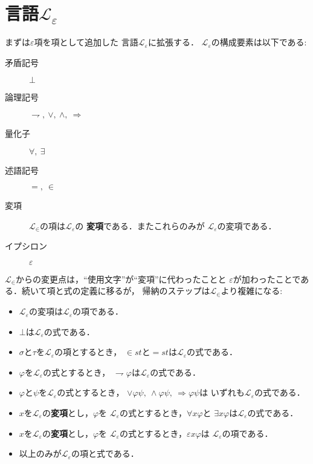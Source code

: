 \section{言語$\mathcal{L}_{\varepsilon}$}
	まずは$\varepsilon$項を項として追加した
	言語$\mathcal{L}_{\varepsilon}$に拡張する．
	$\mathcal{L}_{\varepsilon}$の構成要素は以下である:
	
	\begin{description}
		\item[矛盾記号] $\bot$
		\item[論理記号] $\rightharpoondown,\ \vee,\ \wedge,\ \Longrightarrow$
		\item[量化子] $\forall,\ \exists$
		\item[述語記号] $=,\ \in$
		\item[変項] $\mathcal{L}_{\in}$の項は$\mathcal{L}_{\varepsilon}$の
			{\bf 変項}である．またこれらのみが
			$\mathcal{L}_{\varepsilon}$の変項である．
		\item[イプシロン] $\varepsilon$
	\end{description}
	
	$\mathcal{L}_{\in}$からの変更点は，``使用文字''が``変項''に代わったことと
	$\varepsilon$が加わったことである．続いて項と式の定義に移るが，
	帰納のステップは$\mathcal{L}_{\in}$より複雑になる:
	
	\begin{itemize}
		\item $\mathcal{L}_{\varepsilon}$の変項は$\mathcal{L}_{\varepsilon}$の項である．
		\item $\bot$は$\mathcal{L}_{\varepsilon}$の式である．
		\item $\sigma$と$\tau$を$\mathcal{L}_{\varepsilon}$の項とするとき，
			$\in st$と$=st$は$\mathcal{L}_{\varepsilon}$の式である．
		\item $\varphi$を$\mathcal{L}_{\varepsilon}$の式とするとき，
			$\rightharpoondown \varphi$は$\mathcal{L}_{\varepsilon}$の式である．
		\item $\varphi$と$\psi$を$\mathcal{L}_{\varepsilon}$の式とするとき，
			$\vee \varphi \psi,\ \wedge \varphi \psi,\ \Longrightarrow \varphi \psi$は
			いずれも$\mathcal{L}_{\varepsilon}$の式である．
		\item $x$を$\mathcal{L}_{\varepsilon}$の{\bf 変項}とし，$\varphi$を
			$\mathcal{L}_{\varepsilon}$の式とするとき，$\forall x \varphi$と
			$\exists x \varphi$は$\mathcal{L}_{\varepsilon}$の式である．
		\item $x$を$\mathcal{L}_{\varepsilon}$の{\bf 変項}とし，$\varphi$を
			$\mathcal{L}_{\varepsilon}$の式とするとき，$\varepsilon x \varphi$は
			$\mathcal{L}_{\varepsilon}$の項である．
		\item 以上のみが$\mathcal{L}_{\varepsilon}$の項と式である．
	\end{itemize}
	
